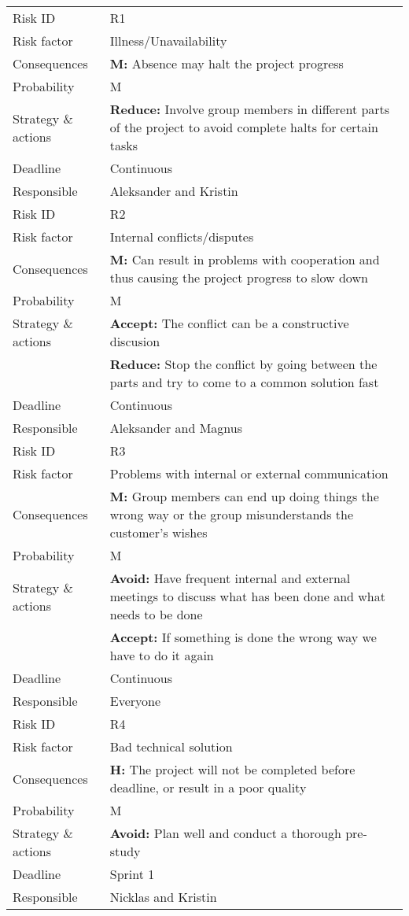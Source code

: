 
\begin{longtable}{>{\setlength\hsize{.3\hsize}}X|>{\setlength\hsize{0.7\hsize}}X}\hline
Risk ID & R1 \\
Risk factor & Illness/Unavailability \\
Consequences & \textbf{M:} Absence may halt the project progress \\
Probability & M \\
Strategy \& actions & \textbf{Reduce:} Involve group members in different parts of the project to avoid complete halts for certain tasks \\
Deadline & Continuous \\
Responsible & Aleksander and Kristin \\ \hline

Risk ID & R2 \\
Risk factor & Internal conflicts/disputes \\
Consequences & \textbf{M:} Can result in problems with cooperation and thus causing the project progress to slow down \\
Probability & M \\
Strategy \& actions & \textbf{Accept:} The conflict can be a constructive discusion\\
 & \textbf{Reduce:} Stop the conflict by going between the parts and try to come to a common solution fast \\
Deadline & Continuous \\
Responsible & Aleksander and Magnus\\ \hline

Risk ID & R3 \\
Risk factor & Problems with internal or external communication \\
Consequences & \textbf{M:} Group members can end up doing things the wrong way or the group misunderstands the customer's wishes \\
Probability & M \\
Strategy \& actions & \textbf{Avoid:} Have frequent internal and external meetings to discuss what has been done and what needs to be done\\
 & \textbf{Accept:} If something is done the wrong way we have to do it again \\
Deadline & Continuous \\
Responsible & Everyone \\ \hline

Risk ID & R4 \hfill\\
Risk factor & Bad technical solution                                                \\
Consequences & \textbf{H:} The project will not be completed before deadline, or result in a poor quality \\
Probability & M \\
Strategy \& actions & \textbf{Avoid:} Plan well and conduct a thorough pre-study \\
Deadline & Sprint 1 \\
Responsible & Nicklas and Kristin \\ \hline


\end{longtable}

